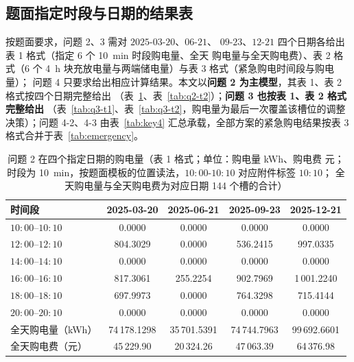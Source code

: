 \subsection{题面指定时段与日期的结果表}

按题面要求，问题 2、3 需对 \(2025\text{-}03\text{-}20\)、\(06\text{-}21\)、
\(09\text{-}23\)、\(12\text{-}21\) 四个日期各给出表 1 格式（指定 6 个 10~min 时段购电量、全天
购电量与全天购电费）、表 2 格式（6 个 4~h 块充放电量与两端储电量）与表 3 格式（紧急购电时间段与购电量）；
问题 4 只要求给出相应计算结果。本文以\textbf{问题 2 为主模型}，其表 1、表 2 格式按四个日期完整给出
（表~\ref{tab:q2-t1}、表~\ref{tab:q2-t2}）；\textbf{问题 3 也按表 1、表 2 格式完整给出}
（表~\ref{tab:q3-t1}、表~\ref{tab:q3-t2}，购电量为最后一次覆盖该槽位的调整决策）；问题 4-2、4-3
由表~\ref{tab:key4} 汇总承载，全部方案的紧急购电结果按表 3 格式合并于表~\ref{tab:emergency}。

\begin{table}[htbp]
  \centering
  \caption{问题 2 在四个指定日期的购电量（表 1 格式；单位：购电量 kWh、购电费 元；
           时段为 10~min，按题面模板的位置读法，\(10{:}00\text{-}10{:}10\) 对应附件标签 \(10{:}10\)；
           全天购电量与全天购电费为对应日期 144 个槽的合计）}
  \label{tab:q2-t1}
  \footnotesize
  \setlength{\tabcolsep}{5pt}
  \begin{tabular}{lcccc}
    \toprule
    时间段 & 2025-03-20 & 2025-06-21 & 2025-09-23 & 2025-12-21 \\
    \midrule
    \(10{:}00\)--\(10{:}10\) & 0.0000 & 0.0000 & 0.0000 & 0.0000 \\
    \(12{:}00\)--\(12{:}10\) & 804.3029 & 0.0000 & 536.2415 & 997.0335 \\
    \(14{:}00\)--\(14{:}10\) & 0.0000 & 0.0000 & 0.0000 & 0.0000 \\
    \(16{:}00\)--\(16{:}10\) & 817.3061 & 255.2254 & 902.7969 & 1\,001.2240 \\
    \(18{:}00\)--\(18{:}10\) & 697.9973 & 0.0000 & 764.3298 & 715.4144 \\
    \(20{:}00\)--\(20{:}10\) & 0.0000 & 0.0000 & 0.0000 & 0.0000 \\
    \midrule
    全天购电量（kWh） & 74\,178.1298 & 35\,701.5391 & 74\,744.7963 & 99\,692.6601 \\
    全天购电费（元） & 45\,229.90 & 20\,324.26 & 47\,063.39 & 64\,376.98 \\
    \bottomrule
  \end{tabular}
\end{table}

